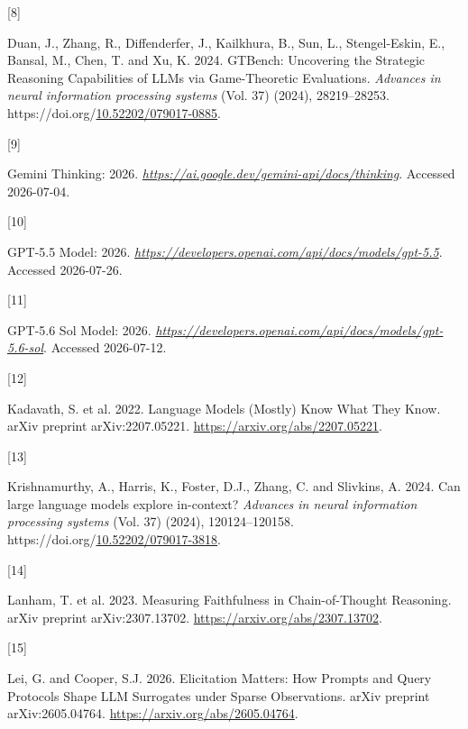 \documentclass[
  11pt,
]{article}
\newlength{\cslhangindent}
\newlength{\csllabelwidth}
\newenvironment{CSLReferences}[2] %
 {\begin{list}{}{%
  \setlength{\itemindent}{0pt}
  \setlength{\leftmargin}{0pt}
  \setlength{\parsep}{0pt}
  \ifodd #1
   \setlength{\leftmargin}{\cslhangindent}
   \setlength{\itemindent}{-1\cslhangindent}
  \fi
  \setlength{\itemsep}{#2\baselineskip}}}
 {\end{list}}
\newcommand{\CSLLeftMargin}[1]{\parbox[t]{\csllabelwidth}{\strut#1\strut}}
\newcommand{\CSLRightInline}[1]{\parbox[t]{\linewidth - \csllabelwidth}{\strut#1\strut}}
\begin{document}
\begin{CSLReferences}{0}{0}
\CSLLeftMargin{{[}8{]} }%
\CSLRightInline{Duan, J., Zhang, R., Diffenderfer, J., Kailkhura, B., Sun, L., Stengel-Eskin, E., Bansal, M., Chen, T. and Xu, K. 2024. {GTBench: Uncovering the Strategic Reasoning Capabilities of LLMs via Game-Theoretic Evaluations}. \emph{Advances in neural information processing systems} (Vol. 37) (2024), 28219--28253. https://doi.org/\href{https://doi.org/10.52202/079017-0885}{10.52202/079017-0885}.}

\CSLLeftMargin{{[}9{]} }%
\CSLRightInline{{Gemini Thinking}: 2026. \href{https://ai.google.dev/gemini-api/docs/thinking}{\emph{https://ai.google.dev/gemini-api/docs/thinking}}. Accessed 2026-07-04.}

\CSLLeftMargin{{[}10{]} }%
\CSLRightInline{{GPT-5.5 Model}: 2026. \href{https://developers.openai.com/api/docs/models/gpt-5.5}{\emph{https://developers.openai.com/api/docs/models/gpt-5.5}}. Accessed 2026-07-26.}

\CSLLeftMargin{{[}11{]} }%
\CSLRightInline{{GPT-5.6 Sol Model}: 2026. \href{https://developers.openai.com/api/docs/models/gpt-5.6-sol}{\emph{https://developers.openai.com/api/docs/models/gpt-5.6-sol}}. Accessed 2026-07-12.}

\CSLLeftMargin{{[}12{]} }%
\CSLRightInline{Kadavath, S. et al. 2022. {Language Models (Mostly) Know What They Know}. arXiv preprint arXiv:2207.05221. \url{https://arxiv.org/abs/2207.05221}.}

\CSLLeftMargin{{[}13{]} }%
\CSLRightInline{Krishnamurthy, A., Harris, K., Foster, D.J., Zhang, C. and Slivkins, A. 2024. {Can large language models explore in-context?} \emph{Advances in neural information processing systems} (Vol. 37) (2024), 120124--120158. https://doi.org/\href{https://doi.org/10.52202/079017-3818}{10.52202/079017-3818}.}

\CSLLeftMargin{{[}14{]} }%
\CSLRightInline{Lanham, T. et al. 2023. {Measuring Faithfulness in Chain-of-Thought Reasoning}. arXiv preprint arXiv:2307.13702. \url{https://arxiv.org/abs/2307.13702}.}

\CSLLeftMargin{{[}15{]} }%
\CSLRightInline{Lei, G. and Cooper, S.J. 2026. {Elicitation Matters: How Prompts and Query Protocols Shape LLM Surrogates under Sparse Observations}. arXiv preprint arXiv:2605.04764. \url{https://arxiv.org/abs/2605.04764}.}


\end{CSLReferences}
\end{document}
